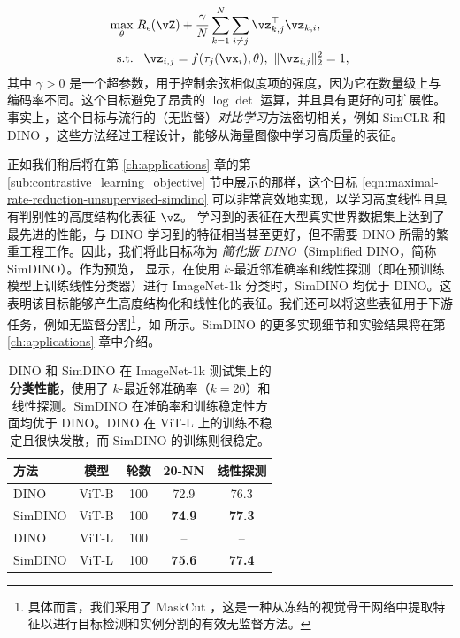 \documentclass[../../book-main_zh.tex]{subfiles}
\begin{document}
\begin{equation}
    \begin{aligned}
        \max_{\theta } & \;  R_{\epsilon}(\vZ) +
        \frac{\gamma}{N}\sum_{k=1}^N \sum_{i \neq j}
        \vz_{k,j}^\top \vz_{k,i}, \\
        \mbox{s.t.} &  \ \ \, \vz_{i,j} = f(\tau_j(\vx_i),\theta),\
        \|\vz_{i,j}\|_2^2                                          = 1,
    \end{aligned}
    \label{eqn:maximal-rate-reduction-unsupervised-simdino}
\end{equation}
其中 $\gamma > 0$ 是一个超参数，用于控制余弦相似度项的强度，因为它在数量级上与编码率不同。这个目标避免了昂贵的 $\log \det$ 运算，并且具有更好的可扩展性。事实上，这个目标与流行的（无监督）{\em 对比学习}方法密切相关，例如 SimCLR \cite{chen2020simple} 和 DINO \cite{caron2021emerging}，这些方法经过工程设计，能够从海量图像中学习高质量的表征。

正如我们稍后将在第 \ref{ch:applications} 章的第 \ref{sub:contrastive_learning_objective} 节中展示的那样，这个目标 \eqref{eqn:maximal-rate-reduction-unsupervised-simdino} 可以非常高效地实现，以学习高度线性且具有判别性的高度结构化表征 $\vZ$。
学习到的表征在大型真实世界数据集上达到了最先进的性能，与 DINO 学习到的特征相当甚至更好，但不需要 DINO 所需的繁重工程工作。因此，我们将此目标称为 {\em 简化版 DINO}（Simplified DINO，简称 SimDINO）。作为预览， 显示，在使用 \(k\)-最近邻准确率和线性探测（即在预训练模型上训练线性分类器）进行 ImageNet-1k 分类时，SimDINO 均优于 DINO。这表明该目标能够产生高度结构化和线性化的表征。我们还可以将这些表征用于下游任务，例如无监督分割\footnote{具体而言，我们采用了 MaskCut \cite{wang2023cut}，这是一种从冻结的视觉骨干网络中提取特征以进行目标检测和实例分割的有效无监督方法。}，如  所示。SimDINO 的更多实现细节和实验结果将在第 \ref{ch:applications} 章中介绍。

\begin{table}
    \centering
    \begin{tabular}{@{}lcccc@{}} %
        \toprule
        方法 & 模型 & 轮数 & 20-NN & 线性探测
        \\
        \midrule
        DINO & ViT-B & 100 & 72.9 & 76.3 \\
        SimDINO & ViT-B & 100 & \bf 74.9 & \bf 77.3 \\
        DINO & ViT-L & 100 & -- & -- \\
        SimDINO & ViT-L & 100 & \bf 75.6 & \bf 77.4 \\

        \bottomrule
    \end{tabular}\smallskip
    \caption{\small DINO 和 SimDINO 在 ImageNet-1k 测试集上的\textbf{分类性能}，使用了 \(k\)-最近邻准确率（\(k = 20\)）和线性探测。SimDINO 在准确率和训练稳定性方面均优于 DINO。DINO 在 ViT-L 上的训练不稳定且很快发散，而 SimDINO 的训练则很稳定。}
    \label{tab:dino_imagenet_linear_probing_teaser}
\end{table}
\end{document}
